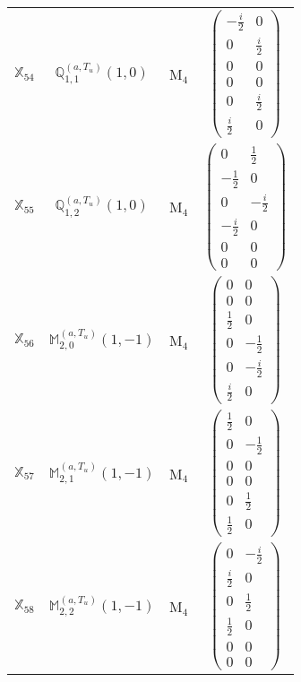 \documentclass[fleqn,10pt,landscape]{article}
\begin{document}
\begin{itemize}
\begin{center}
\begin{longtable}{c|c|c|c}
$ \mathbb{X}_{54} $ & $\mathbb{Q}_{1,1}^{(a,T_{u})}(1,0)$ & M$_{4}$ & $\begin{pmatrix} - \frac{i}{2} & 0 \\ 0 & \frac{i}{2} \\ 0 & 0 \\ 0 & 0 \\ 0 & \frac{i}{2} \\ \frac{i}{2} & 0 \end{pmatrix}$ \\
$ \mathbb{X}_{55} $ & $\mathbb{Q}_{1,2}^{(a,T_{u})}(1,0)$ & M$_{4}$ & $\begin{pmatrix} 0 & \frac{1}{2} \\ - \frac{1}{2} & 0 \\ 0 & - \frac{i}{2} \\ - \frac{i}{2} & 0 \\ 0 & 0 \\ 0 & 0 \end{pmatrix}$ \\
$ \mathbb{X}_{56} $ & $\mathbb{M}_{2,0}^{(a,T_{u})}(1,-1)$ & M$_{4}$ & $\begin{pmatrix} 0 & 0 \\ 0 & 0 \\ \frac{1}{2} & 0 \\ 0 & - \frac{1}{2} \\ 0 & - \frac{i}{2} \\ \frac{i}{2} & 0 \end{pmatrix}$ \\
$ \mathbb{X}_{57} $ & $\mathbb{M}_{2,1}^{(a,T_{u})}(1,-1)$ & M$_{4}$ & $\begin{pmatrix} \frac{1}{2} & 0 \\ 0 & - \frac{1}{2} \\ 0 & 0 \\ 0 & 0 \\ 0 & \frac{1}{2} \\ \frac{1}{2} & 0 \end{pmatrix}$ \\
$ \mathbb{X}_{58} $ & $\mathbb{M}_{2,2}^{(a,T_{u})}(1,-1)$ & M$_{4}$ & $\begin{pmatrix} 0 & - \frac{i}{2} \\ \frac{i}{2} & 0 \\ 0 & \frac{1}{2} \\ \frac{1}{2} & 0 \\ 0 & 0 \\ 0 & 0 \end{pmatrix}$ \\
\end{longtable}

\end{center}
\end{itemize}
\end{document}
